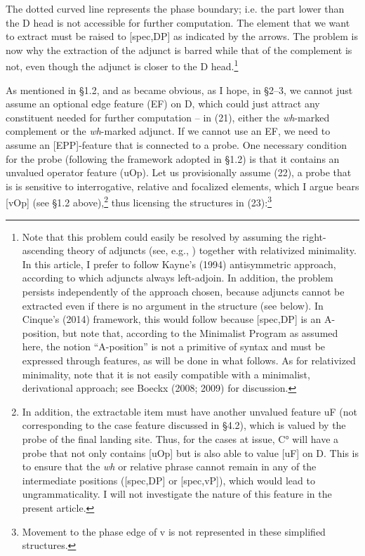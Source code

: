 \documentclass[output=paper]{langsci/langscibook}
\begin{document}
The dotted curved line represents the phase boundary; i.e. the part lower than the D head is not accessible for further computation. The element that we want to extract must be raised to [spec,DP] as indicated by the arrows. The problem is now why the extraction of the adjunct is barred while that of the complement is not, even though the adjunct is closer to the D head.\footnote{Note that this problem could easily be resolved by assuming the right-ascending theory of adjuncts (see, e.g., \citealt{Andrews1983}) together with relativized minimality. In this article, I prefer to follow Kayne’s (1994) antisymmetric approach, according to which adjuncts always left-adjoin. In addition, the problem persists independently of the approach chosen, because adjuncts cannot be extracted even if there is no argument in the structure (see below). In Cinque’s (2014) framework, this would follow because [spec,DP] is an A-position, but note that, according to the Minimalist Program as assumed here, the notion “A-position” is not a primitive of syntax and must be expressed through features, as will be done in what follows. As for relativized minimality, note that it is not easily compatible with a minimalist, derivational approach; see Boeckx (2008; 2009) for discussion.}

  As mentioned in §1.2, and as became obvious, as I hope, in §2–3, we cannot just assume an optional edge feature (EF) on D, which could just attract any constituent needed for further computation – in (21), either the \textit{wh}{}-marked complement or the \textit{wh}{}-marked adjunct. If we cannot use an EF, we need to assume an [EPP]-feature that is connected to a probe. One necessary condition for the probe (following the framework adopted in §1.2) is that it contains an unvalued operator feature (uOp). Let us provisionally assume (22), a probe that is is sensitive to interrogative, relative and focalized elements, which I argue bears [vOp] (see §1.2 above),\footnote{In addition, the extractable item must have another unvalued feature uF (not corresponding to the case feature discussed in §4.2), which is valued by the probe of the final landing site. Thus, for the cases at issue, C° will have a probe that not only contains [uOp] but is also able to value [uF] on D. This is to ensure that the \textit{wh} or relative phrase cannot remain in any of the intermediate positions ([spec,DP] or [spec,vP]), which would lead to ungrammaticality. I will not investigate the nature of this feature in the present article.} thus licensing the structures in (23):\footnote{Movement to the phase edge of v is not represented in these simplified structures.} 
\end{document}
